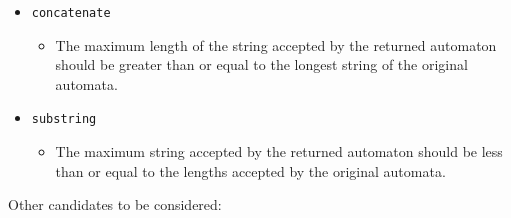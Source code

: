 \documentclass[letterpaper,11pt,twocolumn]{article}
\begin{document}
\begin{itemize}
\item{\texttt{concatenate}}
  \begin{itemize}
  \item{The maximum length of the string accepted by the returned automaton
      should be greater than or equal to the longest string of the original
      automata.}
  \end{itemize}
\item{\texttt{substring}}
  \begin{itemize}
  \item{The maximum string accepted by the returned automaton should be less
      than or equal to the lengths accepted by the original automata.}
  \end{itemize}
\end{itemize}

Other candidates to be considered:
\end{document}
